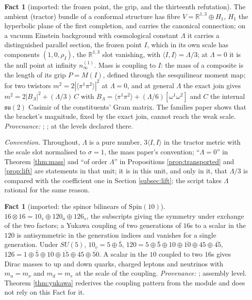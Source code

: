 \documentclass[11pt]{article}
\theoremstyle{definition}
\newtheorem{fact}[theorem]{Fact}
\newcommand{\R}{\mathbb{R}}
\newcommand{\ip}[2]{\langle #1, #2\rangle}
\newcommand{\br}[1]{\langle #1\rangle}
\newcommand{\nInf}{n_{\infty}}
\begin{document}
\begin{fact}[imported: the frozen point, the grip, and the thirteenth refutation]\label{fact:frozen}
The ambient (tractor) bundle of a conformal structure has fibre $V = \R^{1,3} \oplus H_{1}$, $H_{1}$ the hyperbolic plane of the first completion, and carries the canonical connection; on a vacuum Einstein background with cosmological constant $\Lambda$ it carries a distinguished parallel section, the frozen point $I$, which in its own scale has components $(1, 0, \rho_{I})$, the $\R^{1,3}$ slot vanishing, with $\ip{I}{I} = \Lambda/3$; at $\Lambda = 0$ it is the null point at infinity $\nInf^{(1)}$. Mass is coupling to $I$: the mass of a composite is the length of its grip $P = M(I)$, defined through the sesquilinear moment map; for two twistors $m^{2} = 2|\br{\pi^{1}\pi^{2}}|^{2}$ at $\Lambda = 0$, and at general $\Lambda$ the exact join gives $m^{2} = 2|B_{\Lambda}|^{2} + (\Lambda/3)\,C$ with $B_{\Lambda} = \br{\pi^{1}\pi^{2}} + (\Lambda/6)[\omega^{1}\omega^{2}]$ and $C$ the internal $\mathfrak{su}(2)$ Casimir of the constituents' Gram matrix. The families paper shows that the bracket's magnitude, fixed by the exact join, cannot reach the weak scale. \emph{Provenance:} \cite[Fact~2.1, Def.~5.4, Prop.~4.1, Thm.~5.6]{ButlerT11}; \cite[Prop.~4.3]{ButlerT13}; at the levels declared there.
\end{fact}

\emph{Convention.} Throughout, $\Lambda$ is a pure number, $3\ip{I}{I}$ in the tractor metric with the scale slot normalised to $\sigma = 1$, the mass paper's convention; ``$\Lambda = 0$'' in Theorem \ref{thm:mass} and ``of order $\Lambda$'' in Propositions \ref{prop:transported} and \ref{prop:lift} are statements in that unit; it is in this unit, and only in it, that $\Lambda/3$ is compared with the coefficient one in Section \ref{subsec:lift}; the script takes $\Lambda$ rational for the same reason.


\begin{fact}[imported: the spinor bilinears of $\mathrm{Spin}(10)$]\label{fact:bilinears}
$16 \otimes 16 = 10_{s} \oplus 120_{a} \oplus 126_{s}$, the subscripts giving the symmetry under exchange of the two factors; a Yukawa coupling of two generations of $16$s to a scalar in the $120$ is antisymmetric in the generation indices and vanishes for a single generation. Under $SU(5)$, $10_{v} = 5 \oplus \bar{5}$, $120 = 5 \oplus \bar{5} \oplus 10 \oplus \overline{10} \oplus 45 \oplus \overline{45}$, $126 = 1 \oplus \bar{5} \oplus 10 \oplus \overline{15} \oplus 45 \oplus \overline{50}$. A scalar in the $10$ coupled to two $16$s gives Dirac masses to up and down quarks, charged leptons and neutrinos with $m_{u} = m_{\nu}$ and $m_{d} = m_{e}$ at the scale of the coupling. \emph{Provenance:} \cite{Slansky1981}; assembly level. Theorem \ref{thm:yukawa} rederives the coupling pattern from the module and does not rely on this Fact for it.
\end{fact}
\end{document}
